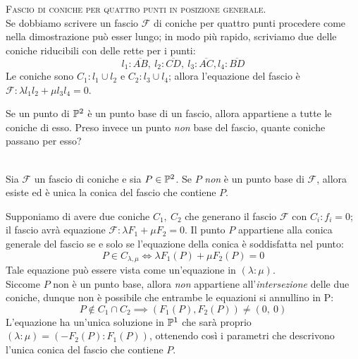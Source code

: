 \begin{tips}\textsc{Fascio di coniche per quattro punti in posizione generale}.\label{fascio coniche per 4 pt pos gen} \\
	Se dobbiamo scrivere un fascio $\mathcal{F}$ di coniche per quattro punti procedere come nella dimostrazione può esser lungo; in modo più rapido, scriviamo due delle coniche riducibili con delle rette per i punti:
	\begin{equation*}
		l_1\colon\overline{AB},\ l_2\colon \overline{CD},\ l_3\colon\overline{AC}, l_4\colon \overline{BD}
	\end{equation*}
	Le coniche sono $C_1\colon l_1\cup l_2$ e $C_2\colon l_3\cup l_4$; allora l'equazione del fascio è $\mathcal{F}\colon \lambda l_1 l_2 + \mu l_3 l_4 =0$.
\end{tips}
Se un punto di $\proj[2]{\ }$ è un punto base di un fascio, allora appartiene a tutte le coniche di esso. Preso invece un punto \textit{non} base del fascio, quante coniche passano per esso?
\begin{proposition}~{}\\
	Sia $\mathcal{F}$ un fascio di coniche e sia $P\in \proj[2]{\ }$. Se $P$ \textit{non} è un punto base di $\mathcal{F}$, allora esiste ed è unica la conica del fascio che contiene $P$.
\end{proposition}
\begin{demonstration}
	Supponiamo di avere due coniche $C_1,\ C_2$ che generano il fascio $\mathcal{F}$ con $C_i\colon f_i=0$; il fascio avrà equazione $\mathcal{F}\colon \lambda F_1 +\mu F_2=0$. Il punto $P$ appartiene alla conica generale del fascio se e solo se l'equazione della conica è soddisfatta nel punto:
		\begin{equation*}
			P\in C_{\lambda,\mu} \iff \lambda F_1\left(P\right) +\mu F_2\left(P\right)=0
		\end{equation*}
	Tale equazione può essere vista come un'equazione in $(\lambda \colon \mu)$.\\
	Siccome $P$ non è un punto base, allora \textit{non} appartiene all'\textit{intersezione} delle due coniche, dunque non è possibile che entrambe le equazioni si annullino in P:
	\begin{equation*}
		P\notin C_1\cap C_2 \implies (F_1\left(P\right), F_2\left(P\right)) \neq \left(0,\ 0\right)
	\end{equation*}
	L'equazione ha un'unica soluzione in $\proj[1]{\ }$ che sarà proprio $(\lambda \colon \mu)=(-F_2\left(P\right)\colon F_1\left(P\right))$, ottenendo così i parametri che descrivono l'unica conica del fascio che contiene $P$.
\end{demonstration}
